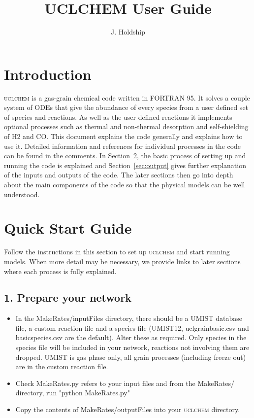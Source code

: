 \documentclass{llncs}
\begin{document}
\title{UCLCHEM User Guide}
\author{J. Holdship}

\maketitle

\section{Introduction}
\textsc{uclchem} is a gas-grain chemical code written in FORTRAN 95. It solves a couple system of ODEs that give the abundance of every species from a user defined set of species and reactions. As well as the user defined reactions it implements optional processes such as thermal and non-thermal desorption and self-shielding of H2 and CO. This document explains the code generally and explains how to use it. Detailed information and references for individual processes in the code can be found in the comments. In Section~\ref{sec:quick}, the basic process of setting up and running the code is explained and Section~\ref{sec:output} gives further explanation of the inputs and outputs of the code. The later sections then go into depth about the main components of the code so that the physical models can be well understood. 

\section{Quick Start Guide}
\label{sec:quick}
Follow the instructions in this section to set up \textsc{uclchem} and start running models. When more detail may be necessary, we provide links to later sections where each process is fully explained.
%
\subsection{1. Prepare your network}
\begin{itemize}
\item In the MakeRates/inputFiles directory, there should be a UMIST database file, a custom reaction file and a species file (UMIST12, uclgrainbasic.csv and basicspecies.csv are the default). Alter these as required. Only species in the species file will be included in your network, reactions not involving them are dropped. UMIST is gas phase only, all grain processes (including freeze out) are in the custom reaction file.
\item Check MakeRates.py refers to your input files and from the MakeRates/ directory, run "python MakeRates.py"
\item Copy the contents of MakeRates/outputFiles into your \textsc{uclchem} directory. 
\end{itemize}
%
\end{document}
